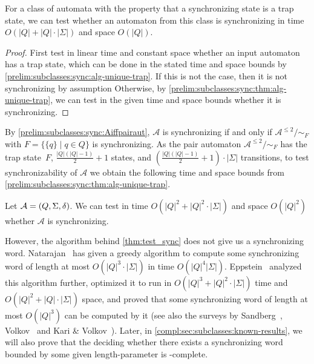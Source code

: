 \begin{corollary} \label{prelim:subclasses:sync:cor:alg-unique-trap}
 For a class of automata with the property that a synchronizing state is a trap state,
 we can test whether an automaton from this class is synchronizing
 in time $O(|Q| + |Q|\cdot |\Sigma|)$
 and space $O(|Q|)$.
\end{corollary}
\begin{proof}
	First test in linear time and constant space whether an input automaton
	has a trap state, which can be done in the stated time and space bounds
	by \cref{prelim:subclasses:sync:alg-unique-trap}.
	If this is not the case, then it is not synchronizing by assumption
	Otherwise, by \cref{prelim:subclasses:sync:thm:alg-unique-trap},
	we can test in the given time and space bounds whether it is synchronizing.		
\end{proof}

By \cref{prelim:subclasses:sync:Aiffpairaut},
$\mathcal A$
is synchronizing if and only if
$\mathcal A^{\le 2} / {\sim_F}$ with $F = \{\{q\}\mid q \in Q\}$
is synchronizing.
As the pair automaton $\mathcal A^{\le 2} / {\sim_F}$ has the trap state~$F$,
$\frac{|Q|(|Q|-1)}{2} + 1$ states,
and $\left( \frac{|Q|(|Q|-1)}{2} + 1 \right) \cdot |\Sigma|$ transitions,
to test synchronizability of $\mathcal A$ we obtain the following time and space bounds from \cref{prelim:subclasses:sync:thm:alg-unique-trap}.

\begin{theorem}
	\label{thm:test_sync}
	Let $\mathcal A = (Q, \Sigma, \delta)$.
	We can test in  time $O\left(|Q|^2 + |Q|^2 \cdot |\Sigma|\right)$
	and space $O\left(|Q|^2\right)$	whether $\mathcal A$ is synchronizing.
\end{theorem}

However, the algorithm behind \cref{thm:test_sync} 
does not give us a synchronizing word. Natarajan~\cite[p.~138]{DBLP:conf/focs/Natarajan86}
has given a greedy algorithm to compute some synchronizing word of length at most $O(|Q|^3 \cdot |\Sigma|)$ in time $O(|Q|^4|\Sigma|)$.
Eppstein~\cite[Thm.~5, 6 \& 7]{Eppstein90} analyzed this algorithm further,
optimized it to run in $O(|Q|^3 + |Q|^2 \cdot |\Sigma|)$ time and $O(|Q|^2 + |Q| \cdot |\Sigma|)$ space, and proved that some synchronizing word of length at most $O(|Q|^3)$ 
can be computed by it (see also the surveys by Sandberg~\cite[Thm. 1.15]{Sandberg04}, Volkov~\cite[p.~16]{DBLP:conf/lata/Volkov08} 
and Kari \& Volkov~\cite[p.~531]{KariVolkov2021}).
Later, in \cref{compl:sec:subclasses:known-results}, we will also prove
that the deciding whether there exists a synchronizing word bounded by some given length-parameter
is \NP-complete.

